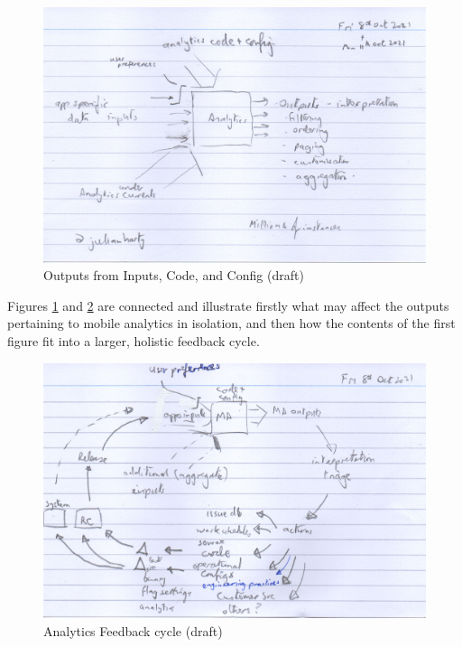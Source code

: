 \begin{figure}
    \includegraphics[width=\linewidth]{images/rough-sketches/outputs_from_inputs_code_config-11-oct-2021.jpeg}
    \caption{Outputs from Inputs, Code, and Config (draft)}
    \label{fig:outputs_from_inputs_code_config}
\end{figure}

Figures \ref{fig:outputs_from_inputs_code_config} and \ref{fig:analytics-feedback-cycle} are connected and illustrate firstly what may affect the outputs pertaining to mobile analytics in isolation, and then how the contents of the first figure fit into a larger, holistic feedback cycle. 

\begin{figure}
    \includegraphics[width=\linewidth]{images/rough-sketches/analytics-feedback-cycle-11-oct-2021.jpeg}
    \caption{Analytics Feedback cycle (draft)}
    \label{fig:analytics-feedback-cycle}
\end{figure}

